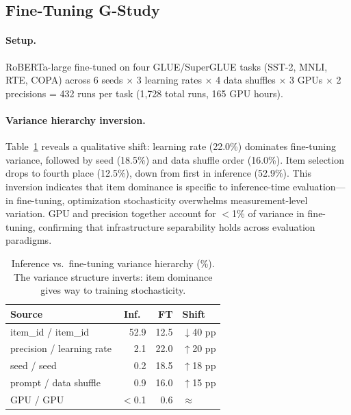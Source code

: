 \documentclass[letterpaper,11pt]{article}
\begin{document}
\subsection{Fine-Tuning G-Study}
\label{sec:finetuning}

\paragraph{Setup.}
RoBERTa-large fine-tuned on four GLUE/SuperGLUE tasks (SST-2, MNLI, RTE, COPA) across 6 seeds $\times$ 3 learning rates $\times$ 4 data shuffles $\times$ 3 GPUs $\times$ 2 precisions = 432 runs per task (1{,}728 total runs, 165 GPU hours).

\paragraph{Variance hierarchy inversion.}
Table~\ref{tab:finetune} reveals a qualitative shift: learning rate (22.0\%) dominates fine-tuning variance, followed by seed (18.5\%) and data shuffle order (16.0\%).
Item selection drops to fourth place (12.5\%), down from first in inference (52.9\%).
This inversion indicates that item dominance is specific to inference-time evaluation---in fine-tuning, optimization stochasticity overwhelms measurement-level variation.
GPU and precision together account for $<$1\% of variance in fine-tuning, confirming that infrastructure separability holds across evaluation paradigms.

\begin{table}[t]
\centering
\caption{Inference vs.\ fine-tuning variance hierarchy (\%). The variance structure inverts: item dominance gives way to training stochasticity.}
\label{tab:finetune}
\small
\begin{tabular}{@{}ll rr l@{}}
\toprule
\multicolumn{2}{l}{Source} & Inf.\ & FT & Shift \\
\midrule
\multicolumn{2}{l}{item\_id / item\_id}        & 52.9 & 12.5 & $\downarrow$40 pp \\
\multicolumn{2}{l}{precision / learning rate}  &  2.1 & 22.0 & $\uparrow$20 pp \\
\multicolumn{2}{l}{seed / seed}                &  0.2 & 18.5 & $\uparrow$18 pp \\
\multicolumn{2}{l}{prompt / data shuffle}      &  0.9 & 16.0 & $\uparrow$15 pp \\
\multicolumn{2}{l}{GPU / GPU}                  & $<$0.1 & 0.6 & $\approx$ \\
\bottomrule
\end{tabular}
\end{table}
\end{document}
